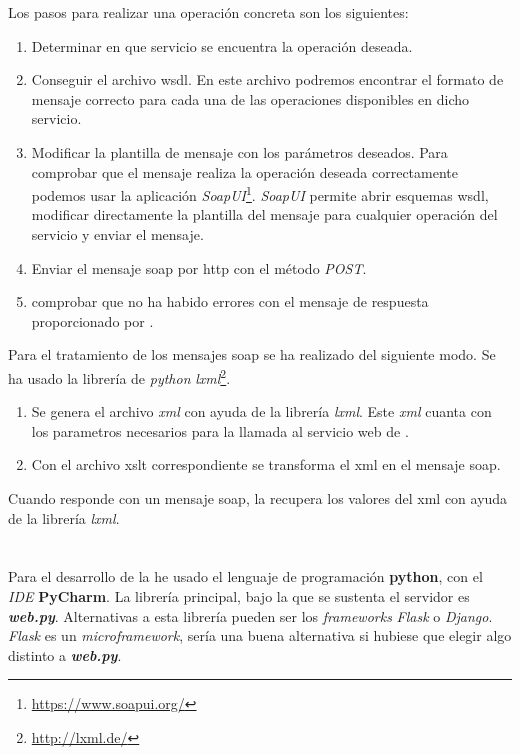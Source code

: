Los pasos para realizar una operación concreta son los siguientes:

\begin{enumerate}
	\item Determinar en que servicio se encuentra la operación deseada.
	\item Conseguir el archivo \acrshort{wsdl}. En este archivo podremos encontrar el formato de mensaje correcto para cada una de las operaciones disponibles en dicho servicio.
	\item Modificar la plantilla de mensaje con los parámetros deseados. 
	Para comprobar que el mensaje realiza la operación deseada correctamente podemos usar la aplicación \textit{SoapUI}\footnote{\url{https://www.soapui.org/}}.
	\textit{SoapUI} permite abrir esquemas \acrshort{wsdl}, modificar directamente la plantilla del mensaje para cualquier operación del servicio y enviar el mensaje.
	\item Enviar el mensaje \acrshort{soap} por \acrshort{http} con el método \textit{POST}.
	\item comprobar que no ha habido errores con el mensaje de respuesta proporcionado por \wday.
\end{enumerate}

Para el tratamiento de los mensajes \acrshort{soap} se ha realizado del siguiente modo.
Se ha usado la librería de \textit{python} \textit{lxml}\footnote{\url{http://lxml.de/}}. 
\begin{enumerate}
	\item Se genera el archivo \textit{xml} con ayuda de la librería \textit{lxml}. Este \textit{xml} cuanta con los parametros necesarios para la llamada al servicio web de \wday{}.
	
	\item Con el archivo \acrshort{xslt} correspondiente se transforma el \acrshort{xml} en el mensaje \acrshort{soap}.
\end{enumerate}

Cuando \wday{} responde con un mensaje \acrshort{soap}, la \iface{} recupera los valores del \acrshort{xml} con ayuda de la librería \textit{lxml}.

\section{\iface{}}


Para el desarrollo de la \iface{} he usado el lenguaje de programación \textbf{python}, con el \textit{IDE} \textbf{PyCharm}. La librería principal, bajo la que se sustenta el servidor es \textbf{\textit{web.py}}.
Alternativas a esta librería pueden ser los \textit{frameworks} \textit{Flask} o \textit{Django}.
\textit{Flask} es un \textit{microframework}, sería una buena alternativa si hubiese que elegir algo distinto a  \textbf{\textit{web.py}}.\\

